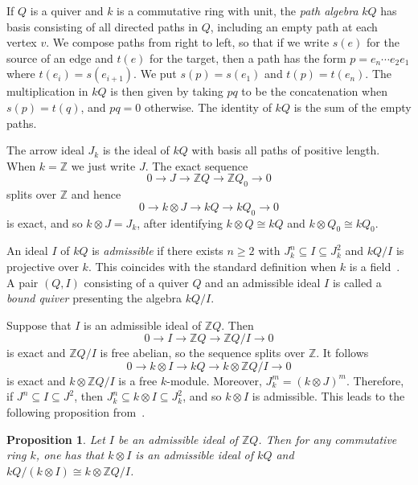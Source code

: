 \documentclass[reqno,11pt]{amsart}
\newtheorem{Prop}[Thm]{Proposition}
\numberwithin{equation}{section}
\begin{document}
If $Q$ is a quiver and $k$ is a commutative ring with unit, the \emph{path algebra} $kQ$ has basis consisting of all directed paths in $Q$, including an empty path at each vertex $v$.  We compose paths from right to left, so that if we write $s(e)$ for the source of an edge and $t(e)$ for the target, then a path has the form $p=e_n\cdots e_2e_1$ where $t(e_i) = s(e_{i+1})$.  We put $s(p) = s(e_1)$ and $t(p)=t(e_n)$.  The multiplication in $kQ$ is then given by taking $pq$ to be the concatenation when $s(p)=t(q)$, and $pq=0$ otherwise. The identity of $kQ$ is the sum of the empty paths.

The arrow ideal $J_k$ is the ideal of $kQ$ with basis all paths of positive length.  When $k=\mathbb Z$ we just write $J$.   The exact sequence
\[0\to J\to \mathbb ZQ\to \mathbb ZQ_0\to 0\] splits over $\mathbb Z$ and hence
\[0\to k\otimes J\to kQ\to kQ_0\to 0\] is exact, and so $k\otimes J= J_k$, after identifying $k\otimes Q\cong kQ$ and $k\otimes Q_0\cong kQ_0$.  

An ideal $I$ of $kQ$ is \emph{admissible} if there exists $n\geq 2$ with $J_k^n\subseteq I\subseteq J_k^2$ and $kQ/I$ is projective over $k$.   This coincides with the standard definition when $k$ is a field~\cite{assem,benson}.  A pair $(Q,I)$ consisting of a quiver $Q$ and an admissible ideal $I$ is called a \emph{bound quiver} presenting the algebra $kQ/I$.

Suppose that $I$ is an admissible ideal of $\mathbb ZQ$.  Then \[0\to I\to \mathbb ZQ\to \mathbb ZQ/I\to 0\] is exact and $\mathbb ZQ/I$ is free abelian, so the sequence splits over $\mathbb Z$.  It follows %
\begin{equation*}\label{eq:tensor.over.k}
0\to k\otimes I\to kQ\to k\otimes \mathbb ZQ/I\to 0
\end{equation*}
is exact and $k\otimes \mathbb ZQ/I$ is a free $k$-module.  Moreover, $J_k^m = (k\otimes J)^m$. %
Therefore, if $J^n\subseteq I\subseteq J^2$, then $J_k^n\subseteq k\otimes I\subseteq J_k^2$, and so $k\otimes I$ is admissible.  This leads to the following proposition from~\cite{bandquiver}.

\begin{Prop}\label{p:admiss.ov.z}
    Let $I$ be an admissible ideal of $\mathbb ZQ$.  Then for any commutative ring $k$, one has that $k\otimes I$ is an admissible ideal of $kQ$ and $kQ/(k\otimes I)\cong k\otimes \mathbb ZQ/I$.  
\end{Prop}
\end{document}
